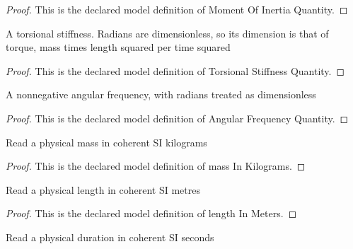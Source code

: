 \begin{proof}
  This is the declared model definition of Moment Of Inertia Quantity.
\end{proof}
\begin{definition}
  \label{def:physics:phyx-mini-0267:phyxminiproblems-problemphyxmini0267-torsionalstiffnessquantity}
  A torsional stiffness. Radians are dimensionless, so its dimension is that of torque, mass times length squared per time squared
\end{definition}
\begin{proof}
  This is the declared model definition of Torsional Stiffness Quantity.
\end{proof}
\begin{definition}
  \label{def:physics:phyx-mini-0267:phyxminiproblems-problemphyxmini0267-angularfrequencyquantity}
  A nonnegative angular frequency, with radians treated as dimensionless
\end{definition}
\begin{proof}
  This is the declared model definition of Angular Frequency Quantity.
\end{proof}
\begin{definition}
  \label{def:physics:phyx-mini-0267:phyxminiproblems-problemphyxmini0267-massinkilograms}
  Read a physical mass in coherent SI kilograms
\end{definition}
\begin{proof}
  This is the declared model definition of mass In Kilograms.
\end{proof}
\begin{definition}
  \label{def:physics:phyx-mini-0267:phyxminiproblems-problemphyxmini0267-lengthinmeters}
  Read a physical length in coherent SI metres
\end{definition}
\begin{proof}
  This is the declared model definition of length In Meters.
\end{proof}
\begin{definition}
  \label{def:physics:phyx-mini-0267:phyxminiproblems-problemphyxmini0267-timeinseconds}
  Read a physical duration in coherent SI seconds
\end{definition}
